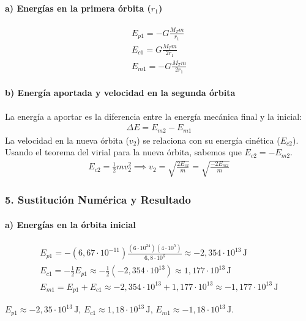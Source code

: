 \paragraph*{a) Energías en la primera órbita ($r_1$)}
\begin{gather}
    E_{p1} = -G\frac{M_T m}{r_1} \\
    E_{c1} = G\frac{M_T m}{2r_1} \\
    E_{m1} = -G\frac{M_T m}{2r_1}
\end{gather}
\paragraph*{b) Energía aportada y velocidad en la segunda órbita}
La energía a aportar es la diferencia entre la energía mecánica final y la inicial:
\begin{gather}
    \Delta E = E_{m2} - E_{m1}
\end{gather}
La velocidad en la nueva órbita ($v_2$) se relaciona con su energía cinética ($E_{c2}$). Usando el teorema del virial para la nueva órbita, sabemos que $E_{c2} = -E_{m2}$.
\begin{gather}
    E_{c2} = \frac{1}{2} m v_2^2 \implies v_2 = \sqrt{\frac{2 E_{c2}}{m}} = \sqrt{\frac{-2 E_{m2}}{m}}
\end{gather}

\subsubsection*{5. Sustitución Numérica y Resultado}
\paragraph*{a) Energías en la órbita inicial}
\begin{gather}
    E_{p1} = -(6,67\cdot10^{-11}) \frac{(6\cdot10^{24})(4\cdot10^5)}{6,8\cdot10^6} \approx -2,354 \cdot 10^{13} \, \text{J} \\
    E_{c1} = -\frac{1}{2} E_{p1} \approx -\frac{1}{2}(-2,354 \cdot 10^{13}) \approx 1,177 \cdot 10^{13} \, \text{J} \\
    E_{m1} = E_{p1} + E_{c1} \approx -2,354 \cdot 10^{13} + 1,177 \cdot 10^{13} \approx -1,177 \cdot 10^{13} \, \text{J}
\end{gather}
\begin{cajaresultado}
    $E_{p1} \approx -2,35 \cdot 10^{13} \, \text{J}$, $E_{c1} \approx 1,18 \cdot 10^{13} \, \text{J}$, $E_{m1} \approx -1,18 \cdot 10^{13} \, \text{J}$.
\end{cajaresultado}
